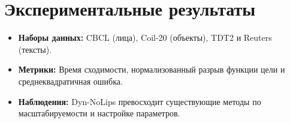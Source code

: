 \documentclass[a4paper,11pt]{article}
\begin{document}
\section{Экспериментальные результаты} 
\begin{itemize} 
	\item \textbf{Наборы данных:} CBCL (лица), Coil-20 (объекты), TDT2 и Reuters (тексты).
	\item \textbf{Метрики:} Время сходимости, нормализованный разрыв функции цели и среднеквадратичная ошибка.
	\item \textbf{Наблюдения:} Dyn-NoLips превосходит существующие методы по масштабируемости и настройке параметров.
\end{itemize}
\end{document}
